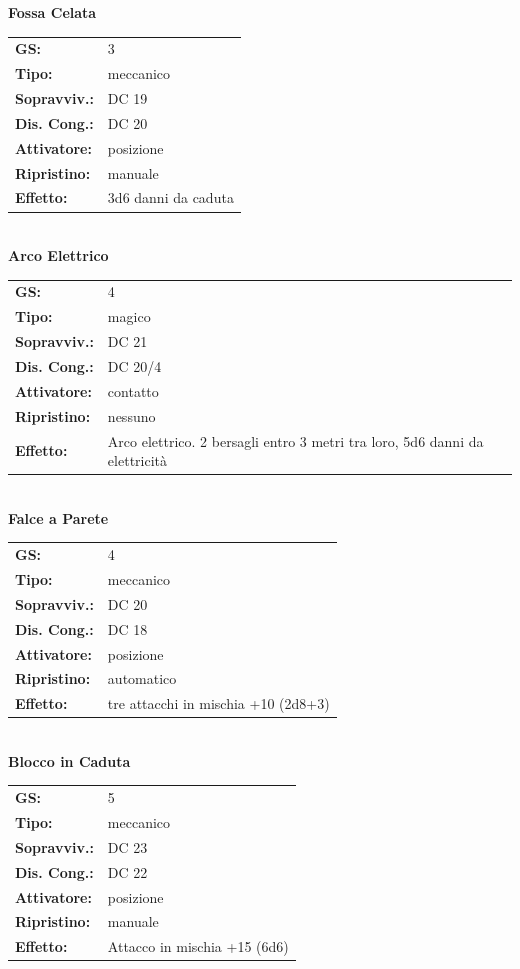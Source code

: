 \begin{multicols}{2}
\textbf{Fossa Celata}

\begin{tabularx}{0.48\textwidth}{lX}
	\textbf{GS:} & 3 \\
	\textbf{Tipo:} & meccanico \\
	\textbf{Sopravviv.:} & DC 19 \\
	\textbf{Dis. Cong.:} & DC 20 \\
	\textbf{Attivatore:} & posizione \\
	\textbf{Ripristino:} & manuale \\
	\textbf{Effetto:} & 3d6 danni da caduta
\end{tabularx}\\

\textbf{Arco Elettrico}

\begin{tabularx}{0.48\textwidth}{lX}
	\textbf{GS:} & 4 \\
	\textbf{Tipo:} & magico \\
	\textbf{Sopravviv.:} & DC 21 \\
	\textbf{Dis. Cong.:} & DC 20/4 \\
	\textbf{Attivatore:} & contatto \\
	\textbf{Ripristino:} & nessuno \\
	\textbf{Effetto:} & Arco elettrico. 2 bersagli entro 3 metri tra loro, 5d6 danni da elettricità
\end{tabularx}\\

\textbf{Falce a Parete}

\begin{tabularx}{0.48\textwidth}{lX}
	\textbf{GS:} & 4 \\
	\textbf{Tipo:} & meccanico \\
	\textbf{Sopravviv.:} & DC 20 \\
	\textbf{Dis. Cong.:} & DC 18 \\
	\textbf{Attivatore:} & posizione \\
	\textbf{Ripristino:} & automatico \\
	\textbf{Effetto:} & tre attacchi in mischia +10 (2d8+3)
\end{tabularx}\\

\textbf{Blocco in Caduta}

\begin{tabularx}{0.48\textwidth}{lX}
	\textbf{GS:} & 5 \\
	\textbf{Tipo:} & meccanico \\
	\textbf{Sopravviv.:} & DC 23 \\
	\textbf{Dis. Cong.:} & DC 22 \\
	\textbf{Attivatore:} & posizione \\
	\textbf{Ripristino:} & manuale \\
	\textbf{Effetto:} & Attacco in mischia +15 (6d6)
\end{tabularx}\\


\end{multicols}
